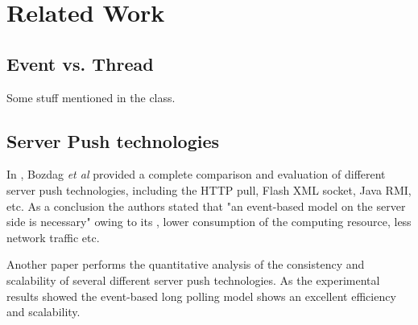\section{Related Work\\}

\subsection{Event vs. Thread\\}

Some stuff mentioned in the class.

\subsection{Server Push technologies\\}

In \cite{Engin}, Bozdag \emph{et al} provided a complete comparison 
and evaluation of different server push technologies, including the 
HTTP pull, Flash XML socket, Java RMI, etc. As a conclusion the authors 
stated that "an event-based model on the server side is necessary" 
owing to its , lower consumption of the computing resource, less network
traffic etc.

Another paper \cite{duquennoy09consistency} performs the quantitative 
analysis of the consistency and scalability of several different server
push technologies. As the experimental results showed the event-based
long polling model shows an excellent efficiency and scalability.

